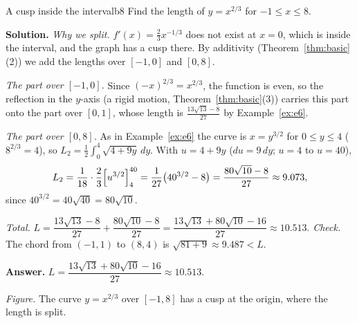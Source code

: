 \documentclass[11pt]{article}
\begin{document}
\begin{exmp}{A cusp inside the interval}{b8}
Find the length of $y=x^{2/3}$ for $-1\le x\le8$.

\textbf{Solution.} \emph{Why we split.} $f'(x)=\frac23x^{-1/3}$ does not exist at $x=0$, which is inside the interval, and the graph has a cusp there. By additivity (Theorem~\ref{thm:basic}(2)) we add the lengths over $[-1,0]$ and $[0,8]$.

\emph{The part over $[-1,0]$.} Since $(-x)^{2/3}=x^{2/3}$, the function is even, so the reflection in the $y$-axis (a rigid motion, Theorem~\ref{thm:basic}(3)) carries this part onto the part over $[0,1]$, whose length is $\frac{13\sqrt{13}-8}{27}$ by Example~\ref{ex:e6}.

\emph{The part over $[0,8]$.} As in Example~\ref{ex:e6} the curve is $x=y^{3/2}$ for $0\le y\le4$ ($8^{2/3}=4$), so $L_2=\frac12\int_0^4\sqrt{4+9y}\,dy$. With $u=4+9y$ ($du=9\,dy$; $u=4$ to $u=40$),
\[
L_2=\frac1{18}\cdot\frac23\Bigl[u^{3/2}\Bigr]_4^{40}=\frac1{27}\bigl(40^{3/2}-8\bigr)=\frac{80\sqrt{10}-8}{27}\approx9.073 ,
\]
since $40^{3/2}=40\sqrt{40}=80\sqrt{10}$.

\emph{Total.} $L=\dfrac{13\sqrt{13}-8}{27}+\dfrac{80\sqrt{10}-8}{27}=\dfrac{13\sqrt{13}+80\sqrt{10}-16}{27}\approx10.513$.
\emph{Check.} The chord from $(-1,1)$ to $(8,4)$ is $\sqrt{81+9}\approx9.487<L$.

\textbf{Answer.} $L=\dfrac{13\sqrt{13}+80\sqrt{10}-16}{27}\approx10.513$.
\begin{center}
\par\small\emph{Figure.} The curve $y=x^{2/3}$ over $[-1,8]$ has a cusp at the origin, where the length is split.
\end{center}
\end{exmp}
\end{document}
